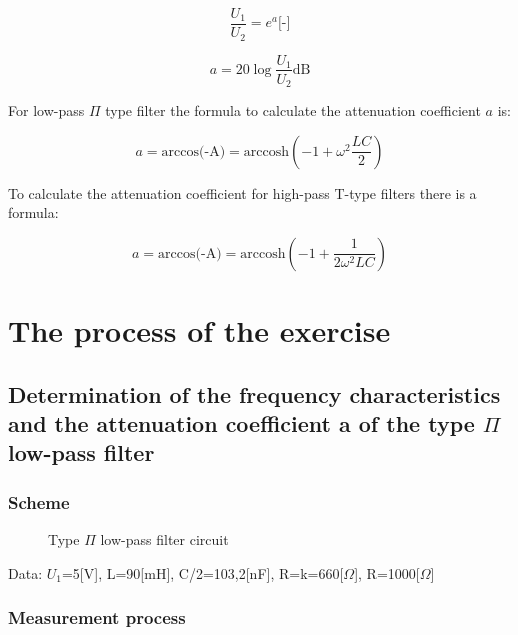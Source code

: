 \documentclass[]{scrartcl}
\begin{document}
\begin{equation}
    \frac{U_1}{U_2}=e^a \text{[-]}
\end{equation}

\begin{equation}
    a=20\log{\frac{U_1}{U_2}} \text{dB}
\end{equation}

\begin{flushleft}
    For low-pass $\Pi$ type filter the formula to calculate the attenuation coefficient $a$ is:  
\end{flushleft}

\begin{equation}
    a=\text{arccos(-A)}=\text{arccosh}(-1+\omega^2\frac{LC}{2})
\end{equation}

\begin{flushleft}
    To calculate the attenuation coefficient for high-pass T-type filters there is a formula: 
\end{flushleft}

\begin{equation}
    a=\text{arccos(-A)}=\text{arccosh}(-1+\frac{1}{2\omega^2LC})
\end{equation}

\section{The process of the exercise}

\subsection{Determination of the frequency characteristics and the attenuation coefficient a of the type $\Pi$ low-pass filter}

\subsubsection{Scheme}

\begin{figure}[H]
	\centering
	
	\caption{Type $\Pi$ low-pass filter circuit}
	\label{fig:circuitfig_series}
\end{figure}

Data: $U_1$=5[V], L=90[mH], C/2=103,2[nF], R=k=660[$\Omega$], R=1000[$\Omega$] 

\subsubsection{Measurement process}
\end{document}
